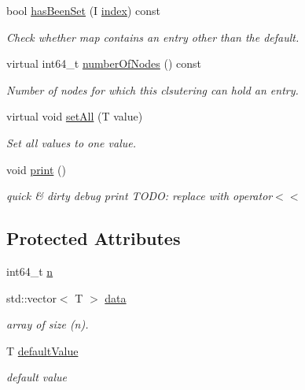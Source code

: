 \begin{DoxyCompactItemize}
bool \hyperlink{class_networ_kit_1_1_index_map_a319166184122c92f427836a89441b39e}{has\-Been\-Set} (I \hyperlink{namespace_networ_kit_af49e67df68af41dcd75dffbb1e9abee6}{index}) const 
\begin{DoxyCompactList}\small\item\em Check whether map contains an entry other than the default. \end{DoxyCompactList}\item 
virtual int64\-\_\-t \hyperlink{class_networ_kit_1_1_index_map_ab2bf024de2a5d5cb47e7ae2e7e3e833b}{number\-Of\-Nodes} () const 
\begin{DoxyCompactList}\small\item\em Number of nodes for which this clsutering can hold an entry. \end{DoxyCompactList}\item 
virtual void \hyperlink{class_networ_kit_1_1_index_map_ac86b82fdac7adf228caaa13e11e8cb89}{set\-All} (T value)
\begin{DoxyCompactList}\small\item\em Set all values to one value. \end{DoxyCompactList}\item 
void \hyperlink{class_networ_kit_1_1_index_map_aa261d0fb3eb6e267f0ce9a8713f5c939}{print} ()
\begin{DoxyCompactList}\small\item\em quick \& dirty debug print T\-O\-D\-O\-: replace with operator$<$$<$ \end{DoxyCompactList}\end{DoxyCompactItemize}
\subsection*{Protected Attributes}
\begin{DoxyCompactItemize}
\item 
int64\-\_\-t \hyperlink{class_networ_kit_1_1_index_map_aabb9796ff1a0c002446b14ff7d4fffbc}{n}
\item 
std\-::vector$<$ T $>$ \hyperlink{class_networ_kit_1_1_index_map_ade29c9c1886b524dc11d0032b6063d83}{data}
\begin{DoxyCompactList}\small\item\em array of size (n). \end{DoxyCompactList}\item 
T \hyperlink{class_networ_kit_1_1_index_map_aa7b9e890a78e37f9e1fd1978b3706c4c}{default\-Value}
\begin{DoxyCompactList}\small\item\em default value \end{DoxyCompactList}\end{DoxyCompactItemize}


